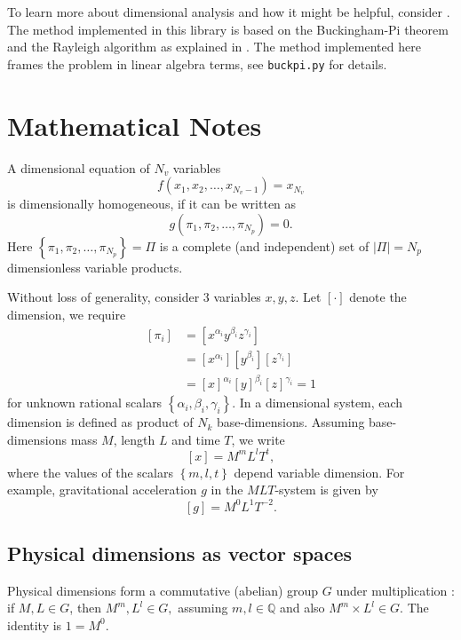 \documentclass[11pt]{article}
\begin{document}
To learn more about dimensional analysis and how it might be helpful, consider \cite{szirtes2007applied, santiago2019first, sonin2001dimensional, lemons2017student,schetz1999fundamentals}. The method implemented in this library is based on the Buckingham-Pi theorem and the Rayleigh algorithm as explained in \cite{szirtes2007applied}. The method implemented here frames the problem in linear algebra terms, see \texttt{buckpi.py} for details.

\section{Mathematical Notes}
A dimensional equation of $N_v$ variables
\begin{equation}
    f(x_1,x_2,\ldots,x_{N_v-1}) = x_{N_v} \label{eq:fnc}
\end{equation}
is dimensionally homogeneous, if it can be written as
\begin{equation}
    g(\pi_1,\pi_2,\ldots,\pi_{N_p}) = 0.
\end{equation}
Here $\left\{\pi_1,\pi_2,\ldots,\pi_{N_p}\right\} = \Pi$ is a complete (and independent) set of $|\Pi|={N_p}$ dimensionless variable products. 

Without loss of generality, consider 3 variables $x,y,z$. Let $\left[\cdot\right]$ denote the dimension, we require
\begin{align}
    \left[\pi_i\right] &= \left[x^{\alpha_i}y^{\beta_i}z^{\gamma_i} \right] \\
    &=\left[x^{\alpha_i}\right]\left[y^{\beta_i}\right]\left[z^{\gamma_i}\right] \\
    &=\left[x\right]^{\alpha_i}\left[y\right]^{\beta_i}\left[z\right]^{\gamma_i} = 1 \label{eq:pi}    
\end{align}
for unknown rational scalars $\left\{\alpha_i,\beta_i,\gamma_i\right\}.$ In a dimensional system, each dimension is defined as product of $N_k$ base-dimensions. Assuming base-dimensions mass $M$, length $L$ and time $T$, we write 
\begin{equation}
    \left[x\right] = M^mL^lT^t, \label{eq:xinmlt}
\end{equation}
where the values of the scalars $\left\{m,l,t\right\}$ depend variable dimension. For example, gravitational acceleration $g$ in the $MLT$-system is given by
\begin{equation}
    \left[g\right] = M^0L^1T^{-2}.
\end{equation}

\subsection{Physical dimensions as vector spaces}
Physical dimensions form a commutative (abelian) group $G$ under multiplication : if $M,L \in G$, then $M^m,L^l \in G,$ assuming $m,l \in \mathbb{Q}$ and also $M^m \times L^l \in G$. The identity is $1 = M^0$.
\end{document}
